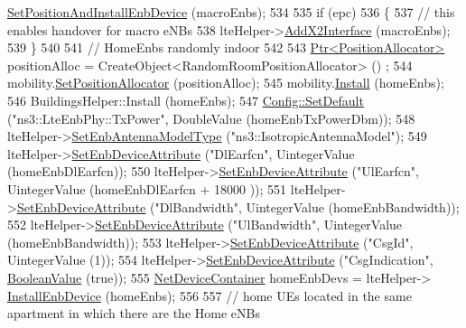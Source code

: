 \begin{DoxyCode}
      \hyperlink{classns3_1_1LteHexGridEnbTopologyHelper_ad16fb01e9df27659bb1c4328542e07d6}{SetPositionAndInstallEnbDevice} (macroEnbs);
534 
535   \textcolor{keywordflow}{if} (epc)
536     \{
537       \textcolor{comment}{// this enables handover for macro eNBs}
538       lteHelper->\hyperlink{classns3_1_1LteHelper_adbbd435f439200097e88a2965668bc26}{AddX2Interface} (macroEnbs);
539     \}
540   
541   \textcolor{comment}{// HomeEnbs randomly indoor}
542 
543   \hyperlink{classns3_1_1Ptr}{Ptr<PositionAllocator>} positionAlloc = CreateObject<RandomRoomPositionAllocator> ()
      ;
544   mobility.\hyperlink{classns3_1_1MobilityHelper_ac59d5295076be3cc11021566713a28c5}{SetPositionAllocator} (positionAlloc);
545   mobility.\hyperlink{classns3_1_1MobilityHelper_a07737960ee95c0777109cf2994dd97ae}{Install} (homeEnbs);
546   BuildingsHelper::Install (homeEnbs);
547   \hyperlink{group__config_ga2e7882df849d8ba4aaad31c934c40c06}{Config::SetDefault} (\textcolor{stringliteral}{"ns3::LteEnbPhy::TxPower"}, DoubleValue (homeEnbTxPowerDbm));
548   lteHelper->\hyperlink{classns3_1_1LteHelper_a758494fc0edaeaf7f311c6aa1c0b42d9}{SetEnbAntennaModelType} (\textcolor{stringliteral}{"ns3::IsotropicAntennaModel"});
549   lteHelper->\hyperlink{classns3_1_1LteHelper_ac42f0f3d6cd8473d810bfbbeb5d592e0}{SetEnbDeviceAttribute} (\textcolor{stringliteral}{"DlEarfcn"}, UintegerValue (homeEnbDlEarfcn));
550   lteHelper->\hyperlink{classns3_1_1LteHelper_ac42f0f3d6cd8473d810bfbbeb5d592e0}{SetEnbDeviceAttribute} (\textcolor{stringliteral}{"UlEarfcn"}, UintegerValue (homeEnbDlEarfcn + 18000
      ));
551   lteHelper->\hyperlink{classns3_1_1LteHelper_ac42f0f3d6cd8473d810bfbbeb5d592e0}{SetEnbDeviceAttribute} (\textcolor{stringliteral}{"DlBandwidth"}, UintegerValue (homeEnbBandwidth));
552   lteHelper->\hyperlink{classns3_1_1LteHelper_ac42f0f3d6cd8473d810bfbbeb5d592e0}{SetEnbDeviceAttribute} (\textcolor{stringliteral}{"UlBandwidth"}, UintegerValue (homeEnbBandwidth));
553   lteHelper->\hyperlink{classns3_1_1LteHelper_ac42f0f3d6cd8473d810bfbbeb5d592e0}{SetEnbDeviceAttribute} (\textcolor{stringliteral}{"CsgId"}, UintegerValue (1));
554   lteHelper->\hyperlink{classns3_1_1LteHelper_ac42f0f3d6cd8473d810bfbbeb5d592e0}{SetEnbDeviceAttribute} (\textcolor{stringliteral}{"CsgIndication"}, 
      \hyperlink{classns3_1_1BooleanValue}{BooleanValue} (\textcolor{keyword}{true}));
555   \hyperlink{classns3_1_1NetDeviceContainer}{NetDeviceContainer} homeEnbDevs  = lteHelper->
      \hyperlink{classns3_1_1LteHelper_a5e009ad35ef85f46b5a6099263f15a03}{InstallEnbDevice} (homeEnbs);
556 
557   \textcolor{comment}{// home UEs located in the same apartment in which there are the Home eNBs}

\end{DoxyCode}
